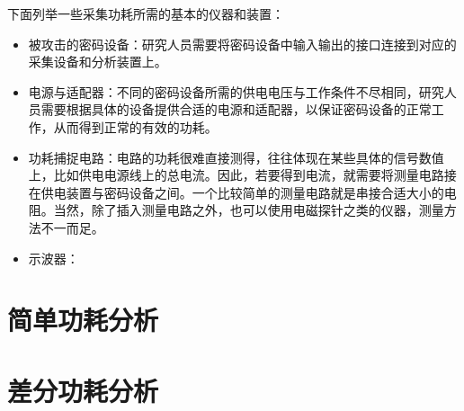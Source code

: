 下面列举一些采集功耗所需的基本的仪器和装置：

\begin{itemize}
\item 被攻击的密码设备：研究人员需要将密码设备中输入输出的接口连接到对应的采集设备和分析装置上。
\item 电源与适配器：不同的密码设备所需的供电电压与工作条件不尽相同，研究人员需要根据具体的设备提供合适的电源和适配器，以保证密码设备的正常工作，从而得到正常的有效的功耗。
\item 功耗捕捉电路：电路的功耗很难直接测得，往往体现在某些具体的信号数值上，比如供电电源线上的总电流。因此，若要得到电流，就需要将测量电路接在供电装置与密码设备之间。一个比较简单的测量电路就是串接合适大小的电阻。当然，除了插入测量电路之外，也可以使用电磁探针之类的仪器，测量方法不一而足。
\item 示波器：

\end{itemize}

\section{简单功耗分析} %

\section{差分功耗分析} %

